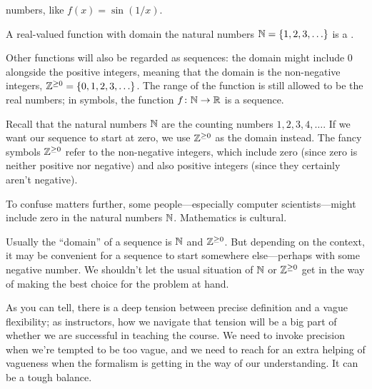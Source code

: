 \documentclass{ximera}
\begin{document}
\begin{example}
\begin{explanation}
\begin{itemize}
    \end{itemize}
  \end{explanation}
\end{example}




numbers, like $f(x)=\sin (1/x)$.

A real-valued function with domain the natural numbers
$\mathbb N=\{1,2,3,\ldots\}$ is a .

Other functions will also be regarded as sequences: the domain might
include $0$ alongside the positive integers, meaning that the
domain is the non-negative integers, $\mathbb Z^{\ge0}=\{0,1,2,3,\ldots\}$.  The range of the function is still
allowed to be the real numbers; in symbols, the function $f\colon
\mathbb N\to\mathbb R$ is a sequence.




Recall that the natural numbers $\mathbb N$ are the counting numbers $1, 2,
3, 4, \ldots$.  If we want our sequence to start at zero, we use
$\mathbb Z^{\ge 0}$ as the domain instead.  The fancy symbols $\mathbb Z^{\ge 0}$
refer to the non-negative integers, which include zero (since zero
is neither positive nor negative) and also positive integers (since
they certainly aren't negative).

To confuse matters further, some people---especially computer
scientists---might include zero in the natural numbers $\mathbb N$.
Mathematics is cultural.


\begin{warning}
  Usually the ``domain'' of a sequence is $\mathbb N$ and $\mathbb Z^{\ge 0}$.  But
  depending on the context, it may be convenient for a sequence to
  start somewhere else---perhaps with some negative number.  We
  shouldn't let the usual situation of $\mathbb N$ or $\mathbb Z^{\ge 0}$ get in the
  way of making the best choice for the problem at hand.
\end{warning}

As you can tell, there is a deep tension between precise definition
and a vague flexibility; as instructors, how we navigate that tension
will be a big part of whether we are successful in teaching the
course.  We need to invoke precision when we're tempted to be too
vague, and we need to reach for an extra helping of vagueness when the
formalism is getting in the way of our understanding.  It can be a
tough balance.
\end{document}
